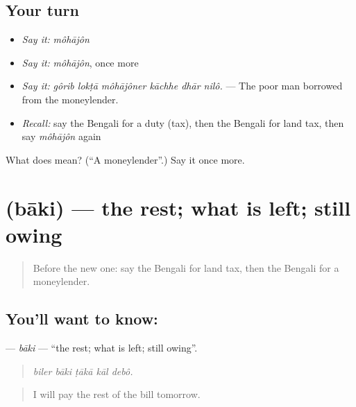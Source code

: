 \subsection*{Your turn}
\begin{itemize}
\raggedright
  \item \emph{Say it:} \emph{môhājôn}
  \item \emph{Say it:} \emph{môhājôn}, once more
  \item \emph{Say it:} \emph{gôrib lokṭā môhājôner kāchhe dhār nilô.} — The poor man borrowed from the moneylender.
  \item \emph{Recall:} say the Bengali for a duty (tax), then the Bengali for land tax, then say \emph{môhājôn} again
\end{itemize}

\begin{tcolorbox}[breakable,colback=teal!4,colframe=teal!35!black,title={Before you move on}]
What does  mean? (\textquotedblleft{}A moneylender\textquotedblright{}.) Say it once more.
\end{tcolorbox}
\section[\texorpdfstring{\bn{বাকি} (bāki)}{বাকি (bāki)}]{ (bāki) — the rest; what is left; still owing}

\label{lesson:BN-C418-baki}



\begin{quote}
Before the new one: say the Bengali for land tax, then the Bengali for a moneylender.
\end{quote}

\subsection*{You'll want to know: }
\textbf{} — \emph{bāki} — \textquotedblleft{}the rest; what is left; still owing\textquotedblright{}.

\begin{quote}
    
\end{quote}

\begin{quote}
\emph{biler bāki ṭākā kāl debô.}
\end{quote}

\begin{quote}
I will pay the rest of the bill tomorrow.
\end{quote}

